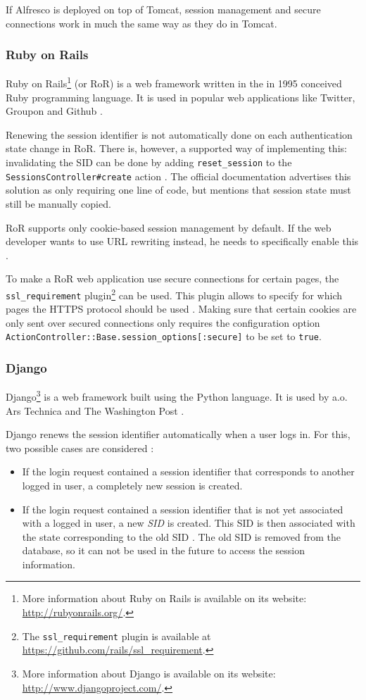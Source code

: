 If Alfresco is deployed on top of Tomcat, session management and secure connections work in much the same way as they do in Tomcat.

\subsubsection{Ruby on Rails}

Ruby on Rails\footnote{More information about Ruby on Rails is available on its website: \url{http://rubyonrails.org/}.} (or RoR) is a web framework written in the in 1995 conceived Ruby programming language. It is used in popular web applications like Twitter, Groupon and Github \cite{RailsApps}.

Renewing the session identifier is not automatically done on each authentication state change in RoR. There is, however, a supported way of implementing this: invalidating the SID can be done by adding \texttt{reset\_session} to the \texttt{SessionsController\#create} action \cite{Webers2008}. The official documentation advertises this solution as only requiring one line of code, but mentions that session state must still be manually copied.

RoR supports only cookie-based session management by default. If the web developer wants to use URL rewriting instead, he needs to specifically enable this \cite{McMahon2010}.

To make a RoR web application use secure connections for certain pages, the \texttt{ssl\_requirement} plugin\footnote{The \texttt{ssl\_requirement} plugin is available at \url{https://github.com/rails/ssl_requirement}.} can be used. This plugin allows to specify for which pages the HTTPS protocol should be used \cite{Slater2008}. Making sure that certain cookies are only sent over secured connections only requires the configuration option \texttt{ActionController::Base.session\_options[:secure]} to be set to \texttt{true}.

\subsubsection{Django}

Django\footnote{More information about Django is available on its website: \url{http://www.djangoproject.com/}.} is a web framework built using the Python language. It is used by a.o. Ars Technica and The Washington Post \cite{DjangoPoweredBy}.

Django renews the session identifier automatically when a user logs in. For this, two possible cases are considered \cite{DjangoLoginCode}:
\begin{itemize}
	\item If the login request contained a session identifier that corresponds to another logged in user, a completely new session is created.
	\item If the login request contained a session identifier that is not yet associated with a logged in user, a new \emph{SID} is created. This SID is then associated with the state corresponding to the old SID \cite{DjangoSessionsCode}. The old SID is removed from the database, so it can not be used in the future to access the session information.
\end{itemize}

